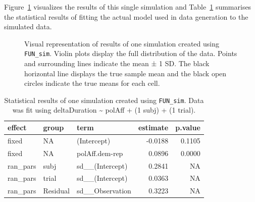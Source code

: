 \documentclass[
  letterpaper,
  DIV=11,
  numbers=noendperiod]{scrartcl}
\begin{document}
Figure~\ref{fig-demoFUNSim} visualizes the results of this single
simulation and Table~\ref{tbl-demoFUNSim} summarises the statistical
results of fitting the actual model used in data generation to the
simulated data.

\begin{figure}


\caption{\label{fig-demoFUNSim}Visual representation of results of one
simulation created using \texttt{FUN\_sim}. Violin plots display the
full distribution of the data. Points and surrounding lines indicate the
mean ± 1 SD. The black horizontal line displays the true sample mean and
the black open circles indicate the true means for each cell.}

\end{figure}%

\label{tbl-demoFUNSim}
\begin{longtable}[]{@{}lllrr@{}}

\caption{\label{tbl-demoFUNSim}Statistical results of one simulation
created using \texttt{FUN\_sim}. Data was fit using deltaDuration
\textasciitilde{} polAff + (1 \textbar{} subj) + (1 \textbar{} trial).}

\tabularnewline

\toprule\noalign{}
effect & group & term & estimate & p.value \\
\midrule\noalign{}
\endhead
\bottomrule\noalign{}
\endlastfoot
fixed & NA & (Intercept) & -0.0188 & 0.1105 \\
fixed & NA & polAff.dem-rep & 0.0896 & 0.0000 \\
ran\_pars & subj & sd\_\_(Intercept) & 0.2841 & NA \\
ran\_pars & trial & sd\_\_(Intercept) & 0.0363 & NA \\
ran\_pars & Residual & sd\_\_Observation & 0.3223 & NA \\

\end{longtable}
\end{document}

